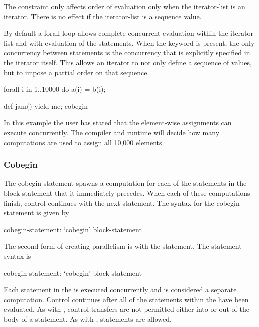 The  constraint only affects order of evaluation only
when the iterator-list is an iterator. There is no effect if the
iterator-list is a sequence value.

By default a forall loop allows complete concurrent evaluation within
the iterator-list and with evaluation of the statements. When
the  keyword is present, the only concurrency between
statements is the concurrency that is explicitly specified in the
iterator itself. This allows an iterator to not only define a sequence of
values, but to impose a partial order on that sequence.


\begin{example}
\begin{chapel}
forall i in 1..10000 do
  a(i) = b(i);

def jam() {
  yield me;
  cobegin {
  }
}
\end{chapel}
In this example the user has stated that the element-wise assignments can
execute concurrently. The compiler and runtime will decide how many
computations are used to assign all 10,000 elements.
\end{example}


\subsubsection{Cobegin}
\label{Cobegin}

The cobegin statement spawns a computation for each of the statements
in the block-statement that it immediately precedes.  When each of
these computations finish, control continues with the next statement.
The syntax for the cobegin statement is given by
\begin{syntax}
cobegin-statement:
  `cobegin' block-statement
\end{syntax}

The second form of creating parallelism is with the 
statement. The  statement syntax is
\begin{syntax}
cobegin-statement:
  `cobegin' block-statement
\end{syntax}
Each statement in the  is executed concurrently
and is considered a separate computation. Control continues after all
of the statements within the  have been
evaluated. As with , control transfers are not permitted
either into or out of the body of a  statement. As
with ,  statements are allowed.

